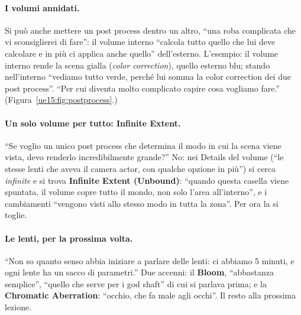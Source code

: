 \paragraph{I volumi annidati.} Si può anche mettere un post process dentro un altro, ``una roba
complicata che vi sconsiglierei di fare'': il volume interno ``calcola tutto quello che lui
deve calcolare e in più ci applica anche quello'' dell'esterno. L'esempio: il volume interno
rende la scena gialla (\emph{color correction}), quello esterno blu; stando nell'interno ``vediamo
tutto verde, perché lui somma la color correction dei due post process''. ``Per cui diventa molto
complicato capire cosa vogliamo fare.'' (Figura~\ref{ue15:fig:postprocess}.)

\paragraph{Un solo volume per tutto: Infinite Extent.} ``Se voglio un unico post process che
determina il modo in cui la scena viene vista, devo renderlo incredibilmente grande?'' No:
nei Details del volume (``le stesse lenti che aveva il camera actor, con qualche opzione in
più'') si cerca \emph{infinite} e si trova \textbf{Infinite Extent (Unbound)}: ``quando questa
casella viene spuntata, il volume copre tutto il mondo, non solo l'area all'interno'', e i
cambiamenti ``vengono visti allo stesso modo in tutta la zona''. Per ora la si toglie.

\paragraph{Le lenti, per la prossima volta.} ``Non so quanto senso abbia iniziare a parlare
delle lenti: ci abbiamo 5 minuti, e ogni lente ha un sacco di parametri.'' Due accenni: il
\textbf{Bloom}, ``abbastanza semplice'', ``quello che serve per i god shaft'' di cui si parlava
prima; e la \textbf{Chromatic Aberration}: ``occhio, che fa male agli occhi''. Il resto alla
prossima lezione.

